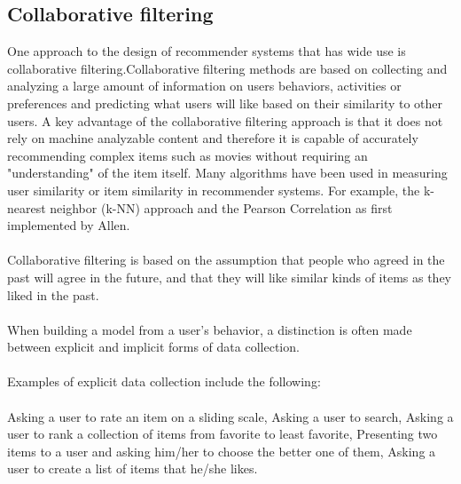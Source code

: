 \documentclass[paper=a4, fontsize=12pt]{scrartcl}
\numberwithin{equation}{section}		%
\numberwithin{figure}{section}			%
\numberwithin{table}{section}				%
\begin{document}
\subsection{Collaborative filtering}

One approach to the design of recommender systems that has wide use is collaborative filtering.Collaborative filtering methods are based on collecting and analyzing a large amount of information on users behaviors, activities or preferences and predicting what users will like based on their similarity to other users. A key advantage of the collaborative filtering approach is that it does not rely on machine analyzable content and therefore it is capable of accurately recommending complex items such as movies without requiring an "understanding" of the item itself. Many algorithms have been used in measuring user similarity or item similarity in recommender systems. For example, the k-nearest neighbor (k-NN) approach and the Pearson Correlation as first implemented by Allen.
\\
\\
Collaborative filtering is based on the assumption that people who agreed in the past will agree in the future, and that they will like similar kinds of items as they liked in the past.
\\
\\
When building a model from a user's behavior, a distinction is often made between explicit and implicit forms of data collection.
\\
\\
Examples of explicit data collection include the following:
\\
\\
Asking a user to rate an item on a sliding scale,
Asking a user to search,
Asking a user to rank a collection of items from favorite to least favorite,
Presenting two items to a user and asking him/her to choose the better one of them,
Asking a user to create a list of items that he/she likes.
\end{document}
